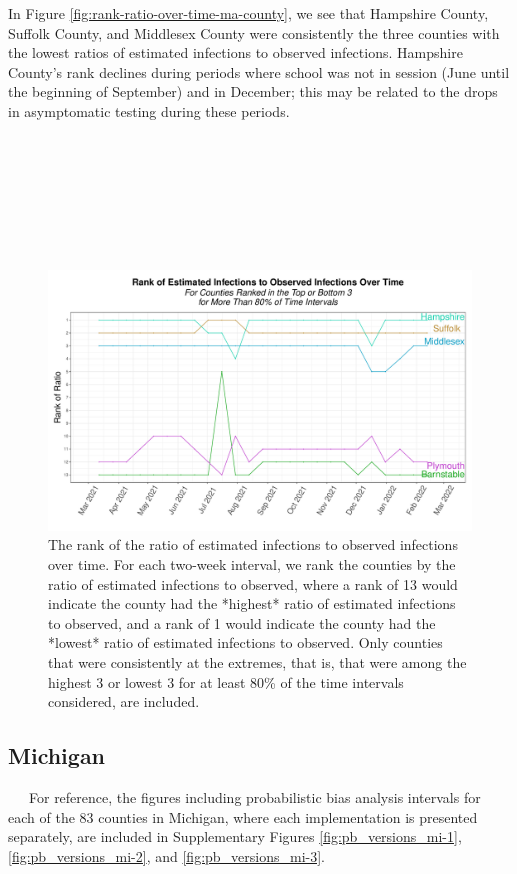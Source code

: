 \documentclass[12pt,twoside]{smiththesis}
\begin{document}
In Figure \ref{fig:rank-ratio-over-time-ma-county}, we see that Hampshire County, Suffolk County, and Middlesex County were consistently the three counties with the lowest ratios of estimated infections to observed infections. Hampshire County's rank declines during periods where school was not in session (June until the beginning of September) and in December; this may be related to the drops in asymptomatic testing during these periods.

~

~

~

~
\begin{figure}
\includegraphics[width=1\linewidth]{figure/rank-ratio-over-time-ma-county} \caption{\label{fig:rank-ratio-over-time-ma-county}The rank of the ratio of estimated infections to observed infections over time. For each two-week interval, we rank the counties by the ratio of estimated infections to observed, where a rank of 13 would indicate the county had the *highest* ratio of estimated infections to observed, and a rank of 1   would indicate the county had the *lowest* ratio of estimated infections to observed. Only counties that were consistently at the extremes, that is, that were among the highest 3 or lowest 3 for at least 80\% of the time intervals considered, are included.}\label{fig:unnamed-chunk-84}
\end{figure}
\hypertarget{michigan}{%
\subsection{Michigan}\label{michigan}}

~~~For reference, the figures including probabilistic bias analysis intervals for each of the 83 counties in Michigan, where each implementation is presented separately, are included in Supplementary Figures \ref{fig:pb_versions_mi-1}, \ref{fig:pb_versions_mi-2}, and \ref{fig:pb_versions_mi-3}.
\end{document}
